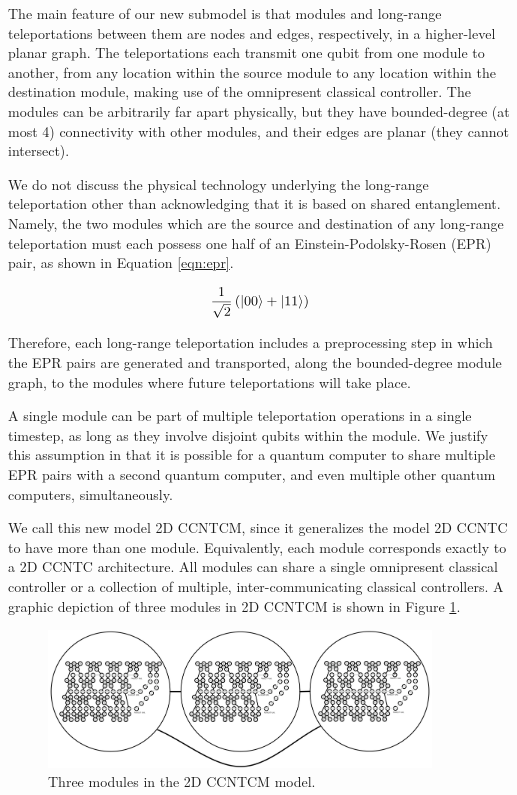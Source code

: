 The main feature of our new submodel is that modules
and long-range teleportations between them are nodes and edges, respectively,
in a higher-level planar graph. The teleportations each transmit one qubit
from one module to another, from any location within the source module
to any location within the destination module, making use of the
omnipresent classical controller. The modules can be arbitrarily far
apart physically, but they have bounded-degree (at most 4) connectivity with other
modules, and their edges are planar (they cannot intersect).

We do not discuss the physical technology underlying the long-range
teleportation other than acknowledging that it is based on shared
entanglement. Namely, the two modules which are the source and destination
of any long-range teleportation must each possess one half of an
Einstein-Podolsky-Rosen (EPR) pair, as shown in Equation \ref{eqn:epr}.

\begin{equation}
\frac{1}{\sqrt{2}} \left( \left\vert{00}\right\rangle + \left\vert{11}\right\rangle \right)
\end{equation}

Therefore, each long-range teleportation includes a preprocessing step in
which the EPR pairs are generated and transported, along the bounded-degree
module graph, to the modules where future teleportations will take place.

A single module can be part of multiple teleportation operations in a single timestep, as long as they involve disjoint qubits within the module.
We justify this assumption in that it is
possible for a quantum computer to share multiple EPR pairs with a
second quantum computer, and even multiple other quantum computers,
simultaneously.

We call this new model \textsf{2D CCNTCM}, since it generalizes the
model \textsf{2D CCNTC} to have more than one module. Equivalently,
each module corresponds exactly to a \textsf{2D CCNTC} architecture.
All modules can share a single omnipresent
classical controller or a collection of multiple, inter-communicating classical controllers.
A graphic depiction of three modules in \textsf{2D CCNTCM} is shown in
Figure \ref{fig:modules}.

\begin{figure}[btp!]
\begin{center}
\includegraphics[width=4in]{factor-polylog/figures/modules.pdf}
\end{center}
\caption{Three modules in the \textsf{2D CCNTCM} model.}
\label{fig:modules}
\end{figure}


